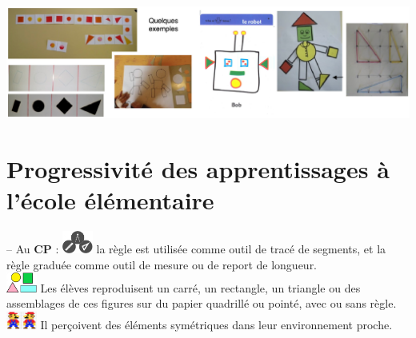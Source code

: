 \begin{center}
   \includegraphics[width=16cm]{Geometrie_did/Images/Geo5_cours_formes_maternelle}
\end{center}


\section{Progressivité des apprentissages à l'école élémentaire}

-- Au {\bf CP} : \includegraphics[width=10mm]{Geometrie_did/Images/Geo5_cours_outils} la règle est utilisée comme outil de tracé de segments, et la règle graduée comme outil de mesure ou de report de longueur.  \\
   \hspace*{14mm} \includegraphics[width=10mm]{Geometrie_did/Images/Geo5_cours_formes} Les élèves reproduisent un carré, un rectangle, un triangle ou des assemblages de ces figures sur du papier quadrillé ou pointé, avec ou sans règle. \\
   \hspace*{14mm} \includegraphics[width=10mm]{Geometrie_did/Images/Geo5_cours_symetrie} Il perçoivent des éléments symétriques dans leur environnement proche.  

